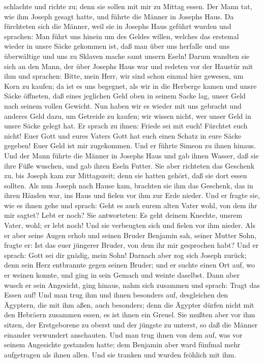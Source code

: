 schlachte und richte zu; denn sie sollen mit mir zu Mittag essen.
 Der Mann tat, wie ihm Joseph gesagt hatte, und führte
die Männer in Josephs Haus.  Da fürchteten sich die
Männer, weil sie in Josephs Haus geführt wurden und sprachen: Man führt
uns hinein um des Geldes willen, welches das erstemal wieder in unsre
Säcke gekommen ist, daß man über uns herfalle und uns überwältige und
uns zu Sklaven mache samt unsern Eseln!  Darum wandten
sie sich an den Mann, der über Josephs Haus war und redeten vor der
Haustür mit ihm  und sprachen: Bitte, mein Herr, wir sind
schon einmal hier gewesen, um Korn zu kaufen;  da ist es
uns begegnet, als wir in die Herberge kamen und unsre Säcke öffneten,
daß eines jeglichen Geld oben in seinem Sacke lag, unser Geld nach
seinem vollen Gewicht.  Nun haben wir es wieder mit uns
gebracht und anderes Geld dazu, um Getreide zu kaufen; wir wissen nicht,
wer unser Geld in unsre Säcke gelegt hat.  Er sprach zu
ihnen: Friede sei mit euch! Fürchtet euch nicht! Euer Gott und eures
Vaters Gott hat euch einen Schatz in eure Säcke gegeben! Euer Geld ist
mir zugekommen. Und er führte Simeon zu ihnen hinaus. 
Und der Mann führte die Männer in Josephs Haus und gab ihnen Wasser, daß
sie ihre Füße wuschen, und gab ihren Eseln Futter.  Sie
aber richteten das Geschenk zu, bis Joseph kam zur Mittagszeit; denn sie
hatten gehört, daß sie dort essen sollten.  Als nun
Joseph nach Hause kam, brachten sie ihm das Geschenk, das in ihren
Händen war, ins Haus und fielen vor ihm zur Erde nieder. 
Und er fragte sie, wie es ihnen gehe und sprach: Geht es auch eurem
alten Vater wohl, von dem ihr mir sagtet? Lebt er noch? 
Sie antworteten: Es geht deinem Knechte, unsrem Vater, wohl; er lebt
noch! Und sie verbeugten sich und fielen vor ihm nieder. 
Als er aber seine Augen erhob und seinen Bruder Benjamin sah, seiner
Mutter Sohn, fragte er: Ist das euer jüngerer Bruder, von dem ihr mir
gesprochen habt? Und er sprach: Gott sei dir gnädig, mein Sohn!
 Darnach aber zog sich Joseph zurück; denn sein Herz
entbrannte gegen seinen Bruder; und er suchte einen Ort auf, wo er
weinen konnte, und ging in sein Gemach und weinte daselbst.
 Dann aber wusch er sein Angesicht, ging hinaus, nahm
sich zusammen und sprach: Tragt das Essen auf!  Und man
trug ihm und ihnen besonders auf, desgleichen den Ägyptern, die mit ihm
aßen, auch besonders; denn die Ägypter dürfen nicht mit den Hebräern
zusammen essen, es ist ihnen ein Greuel.  Sie mußten aber
vor ihm sitzen, der Erstgeborene zu oberst und der jüngste zu unterst,
so daß die Männer einander verwundert anschauten.  Und
man trug ihnen von dem auf, was vor seinem Angesichte gestanden hatte;
dem Benjamin aber ward fünfmal mehr aufgetragen als ihnen allen. Und sie
tranken und wurden fröhlich mit ihm.

